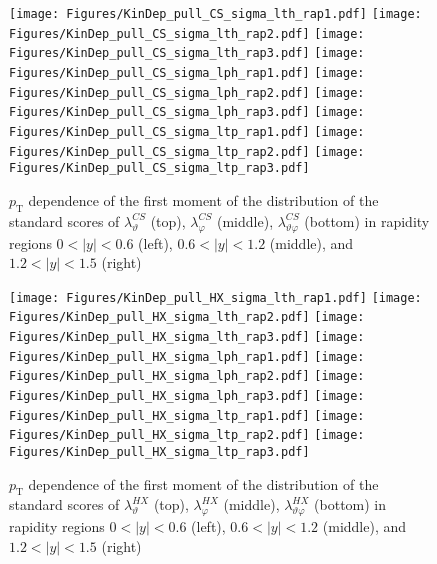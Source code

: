 \documentclass[12pt]{article}
\newcommand{\pT}{p_\mathrm{T}}
\newcommand{\absy}{\left |  y \right |}
\newcommand{\lamthCS}{\lambda^{\scriptscriptstyle CS}_\vartheta}
\newcommand{\lamphCS}{\lambda^{\scriptscriptstyle CS}_\varphi}
\newcommand{\lamthphCS}{\lambda^{\scriptscriptstyle CS}_{\vartheta \varphi}}
\newcommand{\lamthHX}{\lambda^{\scriptscriptstyle HX}_\vartheta}
\newcommand{\lamphHX}{\lambda^{\scriptscriptstyle HX}_\varphi}
\newcommand{\lamthphHX}{\lambda^{\scriptscriptstyle HX}_{\vartheta \varphi}}
\begin{document}
\begin{figure}[htbp]
\centering
\texttt{[image: Figures/KinDep\_pull\_CS\_sigma\_lth\_rap1.pdf]}
\texttt{[image: Figures/KinDep\_pull\_CS\_sigma\_lth\_rap2.pdf]}
\texttt{[image: Figures/KinDep\_pull\_CS\_sigma\_lth\_rap3.pdf]}
\texttt{[image: Figures/KinDep\_pull\_CS\_sigma\_lph\_rap1.pdf]}
\texttt{[image: Figures/KinDep\_pull\_CS\_sigma\_lph\_rap2.pdf]}
\texttt{[image: Figures/KinDep\_pull\_CS\_sigma\_lph\_rap3.pdf]}
\texttt{[image: Figures/KinDep\_pull\_CS\_sigma\_ltp\_rap1.pdf]}
\texttt{[image: Figures/KinDep\_pull\_CS\_sigma\_ltp\_rap2.pdf]}
\texttt{[image: Figures/KinDep\_pull\_CS\_sigma\_ltp\_rap3.pdf]}
\caption{$\pT$ dependence of the first moment of the distribution of the
standard scores of $\lamthCS$ (top), $\lamphCS$ (middle), $\lamthphCS$ (bottom) in rapidity
regions $0<\absy<0.6$ (left), $0.6<\absy<1.2$ (middle), and $1.2<\absy<1.5$ (right)}
\end{figure}
\clearpage

\begin{figure}[htbp]
\centering
\texttt{[image: Figures/KinDep\_pull\_HX\_sigma\_lth\_rap1.pdf]}
\texttt{[image: Figures/KinDep\_pull\_HX\_sigma\_lth\_rap2.pdf]}
\texttt{[image: Figures/KinDep\_pull\_HX\_sigma\_lth\_rap3.pdf]}
\texttt{[image: Figures/KinDep\_pull\_HX\_sigma\_lph\_rap1.pdf]}
\texttt{[image: Figures/KinDep\_pull\_HX\_sigma\_lph\_rap2.pdf]}
\texttt{[image: Figures/KinDep\_pull\_HX\_sigma\_lph\_rap3.pdf]}
\texttt{[image: Figures/KinDep\_pull\_HX\_sigma\_ltp\_rap1.pdf]}
\texttt{[image: Figures/KinDep\_pull\_HX\_sigma\_ltp\_rap2.pdf]}
\texttt{[image: Figures/KinDep\_pull\_HX\_sigma\_ltp\_rap3.pdf]}
\caption{$\pT$ dependence of the first moment of the distribution of the
standard scores of $\lamthHX$ (top), $\lamphHX$ (middle), $\lamthphHX$ (bottom) in rapidity
regions $0<\absy<0.6$ (left), $0.6<\absy<1.2$ (middle), and $1.2<\absy<1.5$ (right)}
\end{figure}
\clearpage
\end{document}
